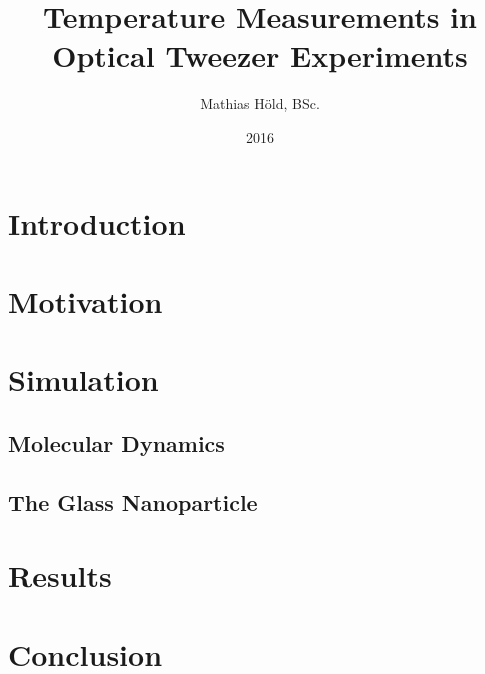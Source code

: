 \documentclass[12pt]{article}
\begin{document}
\title{Temperature Measurements in Optical Tweezer Experiments}
\author{Mathias H\"old, BSc.}
\date{2016}
\maketitle
\thispagestyle{empty}
\newpage
\section{Introduction}






\newpage
\section{Motivation}







\newpage
\section{Simulation}
\subsection{Molecular Dynamics}


\subsection{The Glass Nanoparticle}






\newpage
\section{Results}






\newpage
\section{Conclusion}






\newpage


\end{document}
